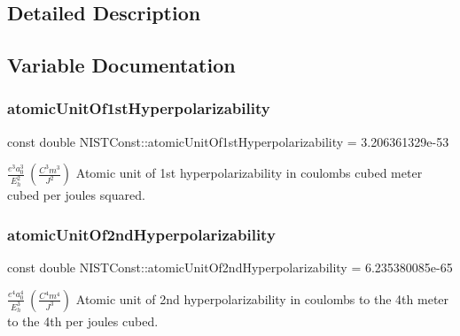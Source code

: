 \subsection{Detailed Description}


\subsection{Variable Documentation}
\mbox{\label{group___atomic_unit_gaa43ceaed22f3b69aee64d117cae645fb}} 
\subsubsection{\texorpdfstring{atomic\+Unit\+Of1st\+Hyperpolarizability}{atomicUnitOf1stHyperpolarizability}}
{\footnotesize\ttfamily const double N\+I\+S\+T\+Const\+::atomic\+Unit\+Of1st\+Hyperpolarizability = 3.\+206361329e-\/53}

$\frac{e^3 a_0^3}{E_h^2} \ (\frac{C^3 m^3}{J^2})$ Atomic unit of 1st hyperpolarizability in coulombs cubed meter cubed per joules squared. \mbox{\label{group___atomic_unit_ga55b22fa50aa069b98aa1bcb050206a8e}} 
\subsubsection{\texorpdfstring{atomic\+Unit\+Of2nd\+Hyperpolarizability}{atomicUnitOf2ndHyperpolarizability}}
{\footnotesize\ttfamily const double N\+I\+S\+T\+Const\+::atomic\+Unit\+Of2nd\+Hyperpolarizability = 6.\+235380085e-\/65}

$\frac{e^4 a_0^4}{E_h^3} \ (\frac{C^4 m^4}{J^3})$ Atomic unit of 2nd hyperpolarizability in coulombs to the 4th meter to the 4th per joules cubed. \mbox{\label{group___atomic_unit_ga6685e215d87395646fc18e2efa30d7a0}} 
